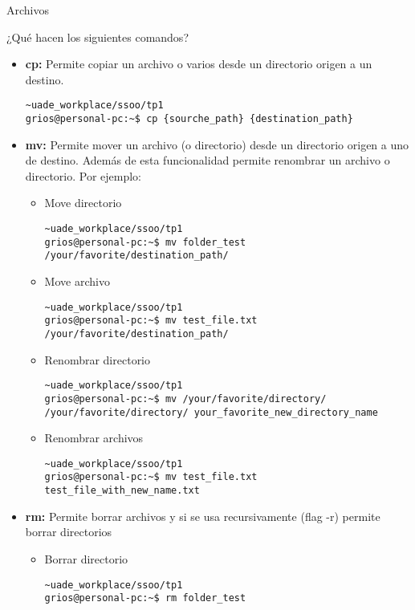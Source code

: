 \begin{section}{Archivos}

\begin{quoting}
¿Qué hacen los siguientes comandos?
\end{quoting}


\begin{itemize}

\item \textbf{cp:}
Permite copiar un archivo o varios desde un directorio origen a un destino.
\begin{lstlisting}[style=Ubuntu]
~uade_workplace/ssoo/tp1
grios@personal-pc:~$ cp {sourche_path} {destination_path}
\end{lstlisting}

\item \textbf{mv:}
Permite mover un archivo (o directorio) desde un directorio origen a uno de destino. Además de esta funcionalidad permite renombrar un archivo o directorio. Por ejemplo:

\begin{itemize}
\item Move directorio
\begin{lstlisting}[style=Ubuntu]
~uade_workplace/ssoo/tp1
grios@personal-pc:~$ mv folder_test /your/favorite/destination_path/
\end{lstlisting}

\item Move archivo
\begin{lstlisting}[style=Ubuntu]
~uade_workplace/ssoo/tp1
grios@personal-pc:~$ mv test_file.txt /your/favorite/destination_path/
\end{lstlisting}

\item Renombrar directorio
\begin{lstlisting}[style=Ubuntu]
~uade_workplace/ssoo/tp1
grios@personal-pc:~$ mv /your/favorite/directory/ /your/favorite/directory/ your_favorite_new_directory_name
\end{lstlisting}

\item Renombrar archivos
\begin{lstlisting}[style=Ubuntu]
~uade_workplace/ssoo/tp1
grios@personal-pc:~$ mv test_file.txt test_file_with_new_name.txt
\end{lstlisting}
\end{itemize}

\item \textbf{rm:}
Permite borrar archivos y si se usa recursivamente (flag -r) permite borrar directorios
\begin{itemize}
\item Borrar directorio
\begin{lstlisting}[style=Ubuntu]
~uade_workplace/ssoo/tp1
grios@personal-pc:~$ rm folder_test
\end{lstlisting}


\end{itemize}
\end{itemize}
\end{section}
